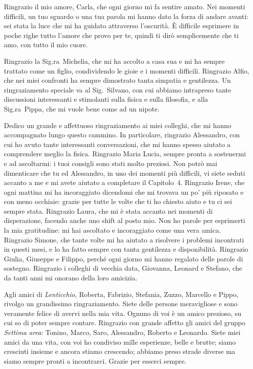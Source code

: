 Ringrazio il mio amore, Carla, che ogni giorno mi fa sentire amato.
Nei momenti difficili, un tuo sguardo o una tua parola mi hanno dato la forza di andare avanti: sei stata la luce che mi ha guidato attraverso l'oscurità.
È difficile esprimere in poche righe tutto l'amore che provo per te, quindi ti dirò semplicemente che ti amo, con tutto il mio cuore.


Ringrazio la Sig.ra~Michelia, che mi ha accolto a casa sua e mi ha sempre trattato come un figlio, condividendo le gioie e i momenti difficili.
Ringrazio Alfio, che nei miei confronti ha sempre dimostrato tanta simpatia e gentilezza.
Un ringraziamento speciale va al Sig.~Silvano, con cui abbiamo intrapreso tante discussioni interessanti e stimolanti sulla fisica e sulla filosofia, e alla Sig.ra~Pippa, che mi vuole bene come ad un nipote.


Dedico un grande e affettuoso ringraziamento ai miei colleghi, che mi hanno accompagnato lungo questo cammino.
In particolare, ringrazio Alessandro, con cui ho avuto tante interessanti conversazioni, che mi hanno spesso aiutato a comprendere meglio la fisica.
Ringrazio Maria Lucia, sempre pronta a sostenermi e ad ascoltarmi: i tuoi consigli sono stati molto preziosi.
Non potrò mai dimenticare che tu ed Alessandro, in uno dei momenti più difficili, vi siete seduti accanto a me e mi avete aiutato a completare il Capitolo~4.
Ringrazio Irene, che ogni mattina mi ha incoraggiato dicendomi che mi trovava un po' più riposato e con meno occhiaie: grazie per tutte le volte che ti ho chiesto aiuto e tu ci sei sempre stata.
Ringrazio Laura, che mi è stata accanto nei momenti di disperazione, facendo anche uno shift al posto mio.
Non ho parole per esprimerti la mia gratitudine: mi hai ascoltato e incoraggiato come una vera amica.
Ringrazio Simone, che tante volte mi ha aiutato a risolvere i problemi incontrati in questi mesi, e lo ha fatto sempre con tanta gentilezza e disponibilità.
Ringrazio Giulia, Giuseppe e Filippo, perché ogni giorno mi hanno regalato delle parole di sostegno.
Ringrazio i colleghi di vecchia data, Giovanna, Leonard e Stefano, che da tanti anni mi onorano della loro amicizia.

Agli amici di \emph{Lenticchio}, Roberta, Fabrizio, Stefania, Zuzzo, Marcello e Pippo, rivolgo un grandissimo ringraziamento. 
Siete delle persone meravigliose e sono veramente felice di avervi nella mia vita.
Ognuno di voi è un amico prezioso, su cui so di poter sempre contare. 
Ringrazio con grande affetto gli amici del gruppo \emph{Settima area}: Tonino, Marco, Saro, Alessandro, Roberto e Leonardo.
Siete miei amici da una vita, con voi ho condiviso mille esperienze, belle e brutte; siamo cresciuti insieme e ancora stiamo crescendo; abbiamo preso strade diverse ma siamo sempre pronti a incontrarci.
Grazie per esserci sempre.


